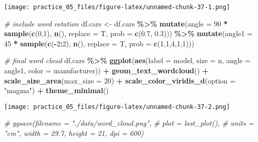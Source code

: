 \documentclass[
]{article}
\newenvironment{Shaded}{\begin{snugshade}}{\end{snugshade}}
\newcommand{\AttributeTok}[1]{\textcolor[rgb]{0.13,0.29,0.53}{#1}}
\newcommand{\CommentTok}[1]{\textcolor[rgb]{0.56,0.35,0.01}{\textit{#1}}}
\newcommand{\DecValTok}[1]{\textcolor[rgb]{0.00,0.00,0.81}{#1}}
\newcommand{\FloatTok}[1]{\textcolor[rgb]{0.00,0.00,0.81}{#1}}
\newcommand{\FunctionTok}[1]{\textcolor[rgb]{0.13,0.29,0.53}{\textbf{#1}}}
\newcommand{\NormalTok}[1]{#1}
\newcommand{\OtherTok}[1]{\textcolor[rgb]{0.56,0.35,0.01}{#1}}
\newcommand{\SpecialCharTok}[1]{\textcolor[rgb]{0.81,0.36,0.00}{\textbf{#1}}}
\newcommand{\StringTok}[1]{\textcolor[rgb]{0.31,0.60,0.02}{#1}}
\begin{document}
\texttt{[image: practice\_05\_files/figure-latex/unnamed-chunk-37-1.png]}

\begin{Shaded}
\begin{Highlighting}[]
\CommentTok{\#   include word rotation }
\NormalTok{df.cars }\OtherTok{\textless{}{-}}\NormalTok{ df.cars }\SpecialCharTok{\%\textgreater{}\%} 
  \FunctionTok{mutate}\NormalTok{(}\AttributeTok{angle =} \DecValTok{90} \SpecialCharTok{*} \FunctionTok{sample}\NormalTok{(}\FunctionTok{c}\NormalTok{(}\DecValTok{0}\NormalTok{,}\DecValTok{1}\NormalTok{), }\FunctionTok{n}\NormalTok{(), }\AttributeTok{replace =}\NormalTok{ T, }\AttributeTok{prob =} \FunctionTok{c}\NormalTok{(}\FloatTok{0.7}\NormalTok{, }\FloatTok{0.3}\NormalTok{))) }\SpecialCharTok{\%\textgreater{}\%} 
  \FunctionTok{mutate}\NormalTok{(}\AttributeTok{angle1 =} \DecValTok{45} \SpecialCharTok{*} \FunctionTok{sample}\NormalTok{(}\FunctionTok{c}\NormalTok{(}\SpecialCharTok{{-}}\DecValTok{2}\SpecialCharTok{:}\DecValTok{2}\NormalTok{), }\FunctionTok{n}\NormalTok{(), }\AttributeTok{replace =}\NormalTok{ T, }\AttributeTok{prob =} \FunctionTok{c}\NormalTok{(}\DecValTok{1}\NormalTok{,}\DecValTok{1}\NormalTok{,}\DecValTok{4}\NormalTok{,}\DecValTok{1}\NormalTok{,}\DecValTok{1}\NormalTok{)))}

\CommentTok{\#   final word cloud}
\NormalTok{df.cars }\SpecialCharTok{\%\textgreater{}\%} 
  \FunctionTok{ggplot}\NormalTok{(}\FunctionTok{aes}\NormalTok{(}\AttributeTok{label =}\NormalTok{ model, }
             \AttributeTok{size =}\NormalTok{ n, }
             \AttributeTok{angle =}\NormalTok{ angle1,}
             \AttributeTok{color =}\NormalTok{ manufacturer)) }\SpecialCharTok{+}
  \FunctionTok{geom\_text\_wordcloud}\NormalTok{() }\SpecialCharTok{+}
  \FunctionTok{scale\_size\_area}\NormalTok{(}\AttributeTok{max\_size =} \DecValTok{20}\NormalTok{) }\SpecialCharTok{+}
  \FunctionTok{scale\_color\_viridis\_d}\NormalTok{(}\AttributeTok{option =} \StringTok{"magma"}\NormalTok{) }\SpecialCharTok{+}
  \FunctionTok{theme\_minimal}\NormalTok{()}
\end{Highlighting}
\end{Shaded}

\texttt{[image: practice\_05\_files/figure-latex/unnamed-chunk-37-2.png]}

\begin{Shaded}
\begin{Highlighting}[]
\CommentTok{\# ggsave(filename = "./data/word\_cloud.png", }
\CommentTok{\#       plot = last\_plot(),}
\CommentTok{\#       units = "cm", width = 29.7, height = 21, dpi = 600) }
\end{Highlighting}
\end{Shaded}
\end{document}
